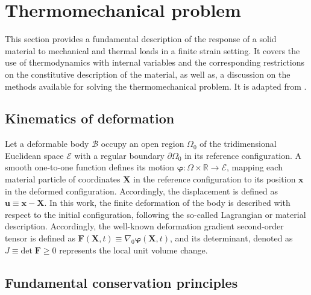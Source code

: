 \chapter{Thermomechanical problem} \label{ch:thermomechanical_problem}

This section provides a fundamental description of the response of a solid material to mechanical and thermal loads in a finite strain setting.
It covers the use of thermodynamics with internal variables and the corresponding restrictions on the constitutive description of the material, as well as, a discussion on the methods available for solving the thermomechanical problem.
It is adapted from \cite{vila-chaNumericalAssessmentPartitioned2023a}.

\section{Kinematics of deformation}

Let a deformable body $\mathscr{B}$ occupy an open region $\Omega_0$ of the tridimensional Euclidean space $\mathscr{E}$ with a regular boundary $\partial \Omega_0$ in its reference configuration.
A smooth one-to-one function defines its motion \(\bm{\varphi}\colon \Omega\times \mathbb{R}\to \mathscr{E}\), mapping each material particle of coordinates $\bm{X}$ in the reference configuration to its position $\bm{x}$ in the deformed configuration.
Accordingly, the displacement is defined as \(\bm{u}\equiv \bm{x} - \bm{X}\).
In this work, the finite deformation of the body is described with respect to the initial configuration, following the so-called Lagrangian or material description.
Accordingly, the well-known deformation gradient second-order tensor is defined as \(\bm{F}(\bm{X},t)\equiv \nabla_0\bm\varphi(\bm{X},t)\), and its determinant, denoted as \(J\equiv \text{det}\;\bm{F} \geq 0\) represents the local unit volume change.

\section{Fundamental conservation principles} \label{sec:fundamental_conservation_princ}

